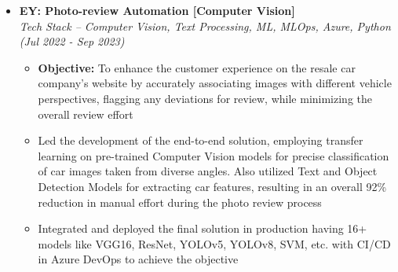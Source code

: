 \documentclass[a4paper,10pt]{article}
\newcommand{\isep}{-2 pt}
\begin{document}
\begin{itemize}
\begin{itemize}
    \\ [-0.5cm]
    \end{itemize}

\item \textbf{EY: Photo-review Automation [Computer Vision]}  \\
    \emph{Tech Stack -- Computer Vision, Text Processing, ML, MLOps, Azure, Python} \hfill {\emph{(Jul 2022 - Sep 2023)}}
    \\[-0.6cm]
    \begin{itemize}\itemsep \isep
    	\item \textbf{Objective:} To enhance the customer experience on the resale car company's website by accurately associating images with different vehicle perspectives, flagging any deviations for review, while minimizing the overall review effort 
        \item Led the development of the end-to-end solution, employing transfer learning on pre-trained Computer Vision models for precise classification of car images taken from diverse angles. Also utilized Text and Object Detection Models for extracting car features, resulting in an overall 92\% reduction in manual effort during the photo review process
        \item Integrated and deployed the final solution in production having 16+ models like VGG16, ResNet, YOLOv5, YOLOv8, SVM, etc. with CI/CD in Azure DevOps to achieve the objective
       
        \\ [-0.5cm]
    \end{itemize}


\end{itemize}
\end{document}
